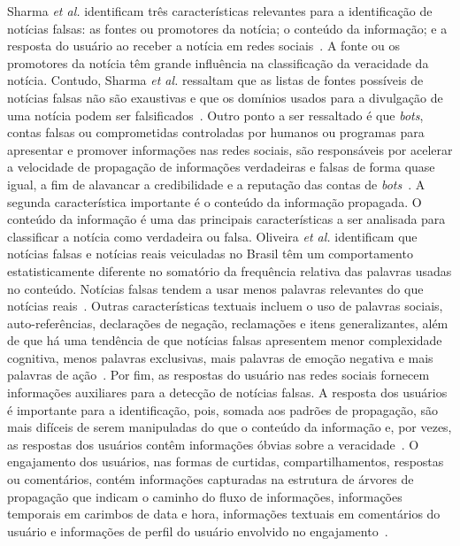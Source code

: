\documentclass{SBCbookchapter}
\begin{document}
Sharma {\it et al.} identificam três características relevantes para a identificação de notícias falsas: as fontes ou promotores da notícia; o conteúdo da informação; e a resposta do usuário ao receber a notícia em redes sociais~\cite{sharma2019combating}. A fonte ou os promotores da notícia têm grande influência na classificação da veracidade da notícia. Contudo, Sharma \textit{et al.} ressaltam que as listas de fontes possíveis de notícias falsas não são exaustivas e que os domínios usados para a divulgação de uma notícia podem ser falsificados~\cite{sharma2019combating}. Outro ponto a ser ressaltado é que {\it bots}, contas falsas ou comprometidas controladas por humanos ou programas para apresentar e promover informações nas redes sociais, são responsáveis por acelerar a velocidade de propagação de informações verdadeiras e falsas de forma quase igual, a fim de alavancar a credibilidade e a reputação das contas de \textit{bots}~\cite{botOrNot}. A segunda característica importante é o conteúdo da informação propagada. O conteúdo da informação é uma das principais características a ser analisada para classificar a notícia como verdadeira ou falsa. Oliveira {\it et al.} identificam que notícias falsas e notícias reais veiculadas no Brasil têm um comportamento estatisticamente diferente no somatório da frequência relativa das palavras usadas no conteúdo. Notícias falsas tendem a usar menos palavras relevantes do que notícias reais~\cite{nicollasspl2020}. Outras características textuais incluem o uso de palavras sociais, auto-referências, declarações de negação, reclamações e itens generalizantes, além de que há uma tendência de que notícias falsas apresentem menor complexidade cognitiva, menos palavras exclusivas, mais palavras de emoção negativa e mais palavras de ação~\cite{sharma2019combating}. Por fim, as respostas do usuário nas redes sociais fornecem informações auxiliares para a detecção de notícias falsas. A resposta dos usuários é importante para a identificação, pois, somada aos padrões de propagação, são mais difíceis de serem manipuladas do que o conteúdo da informação e, por vezes, as respostas dos usuários contêm informações óbvias sobre a veracidade~\cite{zhou2018fake}. O engajamento dos usuários, nas formas de curtidas, compartilhamentos, respostas ou comentários, contém informações capturadas na estrutura de árvores de propagação que indicam o caminho do fluxo de informações, informações temporais em carimbos de data e hora, informações textuais em comentários do usuário e informações de perfil do usuário envolvido no engajamento~\cite{sharma2019combating}.
\end{document}
